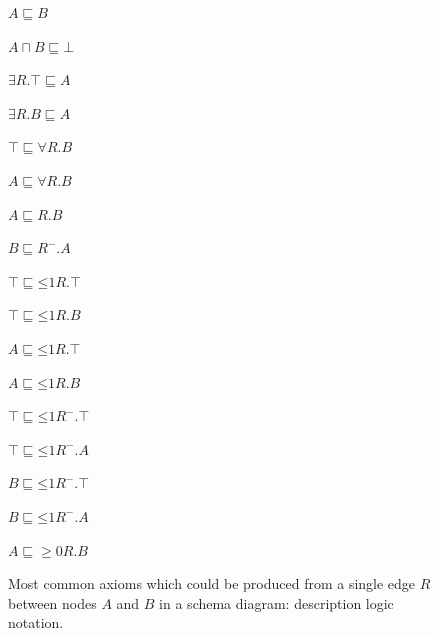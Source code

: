\begin{figure}[tb]
\begin{center}
\begin{minipage}{.3\textwidth}
\begin{compactenum}
\item $A \sqsubseteq B$
\item $A\sqcap B\sqsubseteq \bot$
\item $\exists R.\top \sqsubseteq A$
\item $\exists R.B\sqsubseteq A$
\item $\top \sqsubseteq \forall R.B$ 
\item $A\sqsubseteq \forall R.B$
\end{compactenum}
\end{minipage}
\begin{minipage}{.3\textwidth}
\begin{compactenum}
\setcounter{enumi}{6}
\item $A\sqsubseteq R.B$
\item $B\sqsubseteq R^-.A$
\item $\top \sqsubseteq \mathord{\leq} 1 R.\top$ 
\item $\top \sqsubseteq \mathord{\leq} 1 R.B$
\item $A\sqsubseteq \mathord{\leq} 1 R.\top$
\item $A\sqsubseteq \mathord{\leq} 1 R.B$
\end{compactenum}
\end{minipage}
\begin{minipage}{.3\textwidth}
\begin{compactenum}
\setcounter{enumi}{12}
\item $\top \sqsubseteq \mathord{\leq} 1 R^-.\top$ 
\item $\top \sqsubseteq \mathord{\leq} 1 R^-.A$
\item $B \sqsubseteq \mathord{\leq} 1 R^-.\top$ 
\item $B \sqsubseteq \mathord{\leq} 1 R^-.A$
\item $A \sqsubseteq \mathord{\geq 0} R.B$
\end{compactenum}
\end{minipage}
\caption{Most common axioms which could be produced from a single edge $R$ between nodes $A$ and $B$ in a schema diagram: description logic notation.}\label{fig:generic-triple-axioms-DL}
\end{center}
\end{figure}

